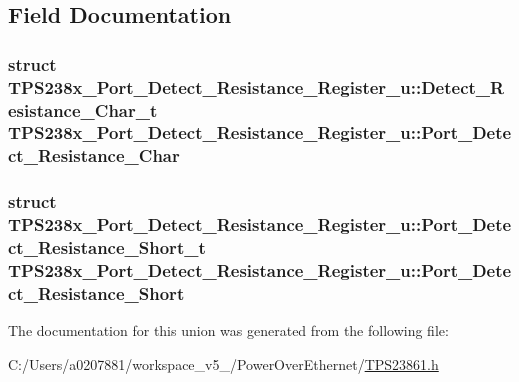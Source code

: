 \subsection{Field Documentation}
\hypertarget{union_t_p_s238x___port___detect___resistance___register__u_abf4ff3f2dbb13bacf1cb9a1f392921e8}{
\subsubsection[{Port\-\_\-\-Detect\-\_\-\-Resistance\-\_\-\-Char}]{\setlength{\rightskip}{0pt plus 5cm}struct {\bf T\-P\-S238x\-\_\-\-Port\-\_\-\-Detect\-\_\-\-Resistance\-\_\-\-Register\-\_\-u\-::\-Detect\-\_\-\-Resistance\-\_\-\-Char\-\_\-t}  T\-P\-S238x\-\_\-\-Port\-\_\-\-Detect\-\_\-\-Resistance\-\_\-\-Register\-\_\-u\-::\-Port\-\_\-\-Detect\-\_\-\-Resistance\-\_\-\-Char}}\label{union_t_p_s238x___port___detect___resistance___register__u_abf4ff3f2dbb13bacf1cb9a1f392921e8}
\hypertarget{union_t_p_s238x___port___detect___resistance___register__u_a7ce5b3c8a626eb76dc3218be69a3af03}{
\subsubsection[{Port\-\_\-\-Detect\-\_\-\-Resistance\-\_\-\-Short}]{\setlength{\rightskip}{0pt plus 5cm}struct {\bf T\-P\-S238x\-\_\-\-Port\-\_\-\-Detect\-\_\-\-Resistance\-\_\-\-Register\-\_\-u\-::\-Port\-\_\-\-Detect\-\_\-\-Resistance\-\_\-\-Short\-\_\-t}  T\-P\-S238x\-\_\-\-Port\-\_\-\-Detect\-\_\-\-Resistance\-\_\-\-Register\-\_\-u\-::\-Port\-\_\-\-Detect\-\_\-\-Resistance\-\_\-\-Short}}\label{union_t_p_s238x___port___detect___resistance___register__u_a7ce5b3c8a626eb76dc3218be69a3af03}


The documentation for this union was generated from the following file\-:\begin{DoxyCompactItemize}
\item 
C\-:/\-Users/a0207881/workspace\-\_\-v5\-\_/\-Power\-Over\-Ethernet/\hyperlink{_t_p_s23861_8h}{T\-P\-S23861.\-h}\end{DoxyCompactItemize}
